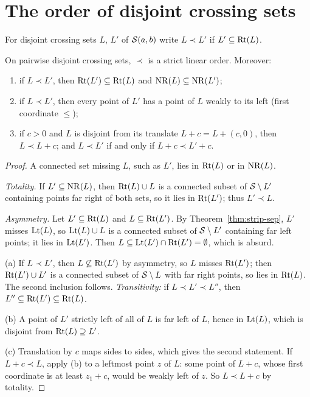 
\section{The order of disjoint crossing sets}

\begin{definition}\label{def:prec}
For disjoint crossing sets $L$, $L'$ of $\mathcal{S}(a,b)$ write $L\prec L'$ if $L'\subseteq\operatorname{Rt}(L)$.
\end{definition}


\begin{proposition}\label{prop:prec}
On pairwise disjoint crossing sets, $\prec$ is a strict linear order. Moreover:
\begin{enumerate}[label=(\alph*)]
\item if $L\prec L'$, then $\operatorname{Rt}(L')\subseteq\operatorname{Rt}(L)$ and $\operatorname{NR}(L)\subseteq\operatorname{NR}(L')$;
\item if $L\prec L'$, then every point of $L'$ has a point of $L$ weakly to its left (first coordinate $\le$);
\item if $c>0$ and $L$ is disjoint from its translate $L+c=L+(c,0)$, then $L\prec L+c$; and $L\prec L'$ if and only if $L+c\prec L'+c$.
\end{enumerate}
\end{proposition}

\begin{proof}
A connected set missing $L$, such as $L'$, lies in $\operatorname{Rt}(L)$ or in $\operatorname{NR}(L)$.

\emph{Totality.} If $L'\subseteq\operatorname{NR}(L)$, then $\operatorname{Rt}(L)\cup L$ is a connected subset of $\mathcal{S}\setminus L'$ containing points far right of both sets, so it lies in $\operatorname{Rt}(L')$; thus
$L'\prec L$.

\emph{Asymmetry.} Let $L'\subseteq\operatorname{Rt}(L)$ and $L\subseteq\operatorname{Rt}(L')$. By Theorem~\ref{thm:strip-sep}, $L'$ misses $\operatorname{Lt}(L)$, so $\operatorname{Lt}(L)\cup L$ is a connected subset of
$\mathcal{S}\setminus L'$ containing far left points; it lies in $\operatorname{Lt}(L')$. Then $L\subseteq\operatorname{Lt}(L')\cap\operatorname{Rt}(L')=\emptyset$, which is absurd.

(a) If $L\prec L'$, then $L\not\subseteq\operatorname{Rt}(L')$ by asymmetry, so $L$ misses $\operatorname{Rt}(L')$; then $\operatorname{Rt}(L')\cup L'$ is a connected subset of $\mathcal{S}\setminus L$ with far right points, so
lies in $\operatorname{Rt}(L)$. The second inclusion follows. \emph{Transitivity:} if $L\prec L'\prec L''$, then $L''\subseteq\operatorname{Rt}(L')\subseteq\operatorname{Rt}(L)$.

(b) A point of $L'$ strictly left of all of $L$ is far left of $L$, hence in $\operatorname{Lt}(L)$, which is disjoint from $\operatorname{Rt}(L)\supseteq L'$.

(c) Translation by $c$ maps sides to sides, which gives the second statement. If $L+c\prec L$, apply (b) to a leftmost point $z$ of $L$: some point of $L+c$, whose first
coordinate is at least $z_1+c$, would be weakly left of $z$. So $L\prec L+c$ by totality.
\end{proof}

